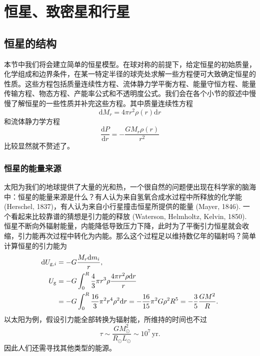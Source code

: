 \documentclass[../天体物理基础.tex]{subfiles}
\begin{document}
\section{恒星、致密星和行星}
\subsection{恒星的结构}
本节中我们将会建立简单的恒星模型。在球对称的前提下，给定恒星的初始质量，化学组成和边界条件，在某一特定半径的球壳处求解一些方程便可大致确定恒星的性质。这些方程包括质量连续性方程、流体静力学平衡方程、能量守恒方程、能量传输方程、物态方程、产能率公式和不透明度公式。我们会在各个小节的叙述中慢慢了解恒星的一些性质并补完这些方程。其中质量连续性方程
\begin{equation}
\mathrm{d}M_{r}=4\pi r^{2}\rho\left(r\right)\mathrm{d}r
\end{equation}
和流体静力学方程
\begin{equation}
\frac{\mathrm{d}P}{\mathrm{d}r}=-\frac{GM_{r}\rho\left(r\right)}{r^{2}}\label{2.1.2}
\end{equation}
比较显然就不赘述了。

\subsubsection{恒星的能量来源}
太阳为我们的地球提供了大量的光和热，一个很自然的问题便出现在科学家的脑海中：恒星的能量来源是什么？有人认为来自氢氧合成水过程中所释放的化学能 (Herschel, 1837)，有人认为来自小行星撞击恒星所提供的能量 (Mayer, 1846). 一个看起来比较靠谱的猜想是引力能的释放 (Waterson, Helmholtz, Kelvin, 1850). 恒星不断向外辐射能量，内能降低导致压力下降，此时为了平衡引力恒星就会收缩，引力能再次过程中转化为内能。那么这个过程足以维持数亿年的辐射吗？简单计算恒星的引力能为
\begin{align}
\mathrm{d}U_{\text{g},i}&=-G\frac{M_{r}\mathrm{d}m_{i}}{r},\notag\\
U_{\text{g}}&=-G\int_{0}^{R}\frac{4}{3}\pi r^{3}\rho \frac{4\pi r^{2}\rho\mathrm{d}r}{r}\notag\\
&=-G\int_{0}^{R}\frac{16}{3}\pi^{2}r^{4}\rho^{2}\mathrm{d}r=-\frac{16}{15}\pi^{2}G\rho^{2}R^{5}=-\frac{3}{5}\frac{GM^{2}}{R}.
\end{align}
以太阳为例，假设引力能全部转换为辐射能，所维持的时间也不过
\begin{equation}
\tau\sim\frac{GM_{\odot}^{2}}{R_{\odot}L_{\odot}}\sim10^{7}\,\mathrm{yr}.
\end{equation}
因此人们还需寻找其他类型的能源。
\end{document}
